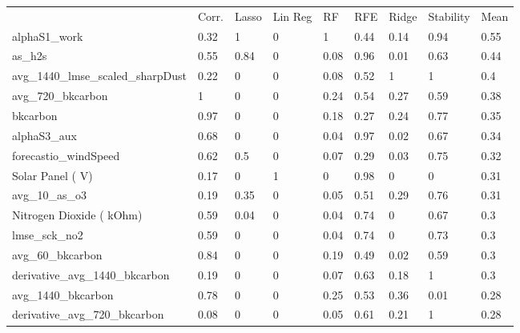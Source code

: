 \begin{table}
\centering
\small
\begin{tabular}{lllllllll}
\\
\\
\toprule
     & Corr. & Lasso & Lin Reg & RF   & RFE  & Ridge & Stability & Mean \\
\midrule
alphaS1\_work                                  & 0.32  & 1     & 0          & 1    & 0.44 & 0.14  & 0.94      & 0.55 \\
as\_h2s                                        & 0.55  & 0.84  & 0          & 0.08 & 0.96 & 0.01  & 0.63      & 0.44 \\
avg\_1440\_lmse\_scaled\_sharpDust             & 0.22  & 0     & 0          & 0.08 & 0.52 & 1     & 1         & 0.4  \\
avg\_720\_bkcarbon                             & 1     & 0     & 0          & 0.24 & 0.54 & 0.27  & 0.59      & 0.38 \\
bkcarbon                                       & 0.97  & 0     & 0          & 0.18 & 0.27 & 0.24  & 0.77      & 0.35 \\
alphaS3\_aux                                   & 0.68  & 0     & 0          & 0.04 & 0.97 & 0.02  & 0.67      & 0.34 \\
forecastio\_windSpeed                          & 0.62  & 0.5   & 0          & 0.07 & 0.29 & 0.03  & 0.75      & 0.32 \\
Solar Panel ( V)                               & 0.17  & 0     & 1          & 0    & 0.98 & 0     & 0         & 0.31 \\
avg\_10\_as\_o3                                & 0.19  & 0.35  & 0          & 0.05 & 0.51 & 0.29  & 0.76      & 0.31 \\
Nitrogen Dioxide ( kOhm)                       & 0.59  & 0.04  & 0          & 0.04 & 0.74 & 0     & 0.67      & 0.3  \\
lmse\_sck\_no2                                 & 0.59  & 0     & 0          & 0.04 & 0.74 & 0     & 0.73      & 0.3  \\
avg\_60\_bkcarbon                              & 0.84  & 0     & 0          & 0.19 & 0.49 & 0.02  & 0.59      & 0.3  \\
derivative\_avg\_1440\_bkcarbon                & 0.19  & 0     & 0          & 0.07 & 0.63 & 0.18  & 1         & 0.3  \\
avg\_1440\_bkcarbon                            & 0.78  & 0     & 0          & 0.25 & 0.53 & 0.36  & 0.01      & 0.28 \\
derivative\_avg\_720\_bkcarbon                 & 0.08  & 0     & 0          & 0.05 & 0.61 & 0.21  & 1         & 0.28 \\

\end{tabular}
\end{table}
